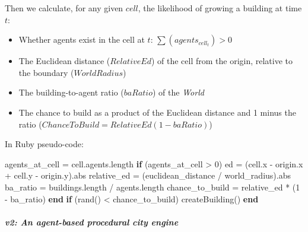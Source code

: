 \documentclass[]{article}
\newenvironment{Shaded}{}{}
\newcommand{\KeywordTok}[1]{\textcolor[rgb]{0.00,0.44,0.13}{\textbf{{#1}}}}
\newcommand{\DecValTok}[1]{\textcolor[rgb]{0.25,0.63,0.44}{{#1}}}
\newcommand{\NormalTok}[1]{{#1}}
\begin{document}
Then we calculate, for any given \(cell\), the likelihood of growing a
building at time \(t\):

\begin{itemize}
\itemsep1pt\parskip0pt
\item
  Whether agents exist in the cell at \(t\):
  \(\sum(agents_{cell_t}) > 0\)
\item
  The Euclidean distance (\(RelativeEd\)) of the cell from the origin,
  relative to the boundary (\(WorldRadius\))
\item
  The building-to-agent ratio (\(baRatio\)) of the \emph{World}
\item
  The chance to build as a product of the Euclidean distance and 1 minus
  the ratio (\(ChanceToBuild = RelativeEd (1 - baRatio)\))
\end{itemize}

In Ruby pseudo-code:

\begin{Shaded}
\begin{Highlighting}[]

\NormalTok{agents_at_cell = cell.agents.length}
\KeywordTok{if} \NormalTok{(agents_at_cell > }\DecValTok{0}\NormalTok{) }
    \NormalTok{ed = (cell.x - origin.x + cell.y - origin.y).abs}
    \NormalTok{relative_ed = (euclidean_distance / world_radius).abs}
    \NormalTok{ba_ratio = buildings.length / agents.length}
    \NormalTok{chance_to_build = relative_ed * (}\DecValTok{1} \NormalTok{- ba_ratio)}
\KeywordTok{end}
\KeywordTok{if} \NormalTok{(rand() < chance_to_build)}
    \NormalTok{createBuilding()}
\KeywordTok{end}
\end{Highlighting}
\end{Shaded}

\subparagraph{v2: An agent-based procedural city
engine}\label{v2-an-agent-based-procedural-city-engine}
\end{document}
